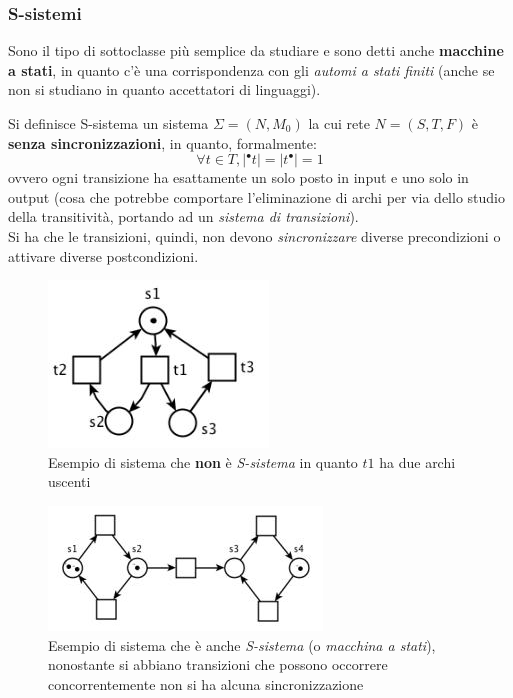 \documentclass[a4paper,12pt, oneside]{book}
\begin{document}
\subsubsection{S-sistemi}
Sono il tipo di sottoclasse più semplice da studiare e sono detti anche
\textbf{macchine a stati}, in quanto c'è una corrispondenza con gli
\textit{automi a stati finiti} (anche se non si studiano in quanto accettatori
di linguaggi).
\begin{definizione}
  Si definisce S-sistema un sistema $\Sigma = (N,M_0)$ la cui rete $N=(S,T,F)$ è
  \textbf{senza sincronizzazioni}, in quanto, formalmente:
  \[\forall t\in T, |^\bullet t|=|t^\bullet|=1\]
  ovvero ogni transizione ha esattamente un solo posto in input e uno solo in
  output (cosa che potrebbe comportare l'eliminazione di archi per via dello
  studio della transitività, portando ad un \textit{sistema di transizioni}).\\
  Si ha che le transizioni, quindi, non devono \textit{sincronizzare} diverse
  precondizioni o attivare diverse postcondizioni.
  \begin{figure}[H]
    \centering
    \includegraphics[scale = 0.7]{img/ssi.jpg}
    \caption{Esempio di sistema che \textbf{non} è \emph{S-sistema} in quanto
      $t1$ ha due archi uscenti}
  \end{figure}
   \begin{figure}[H]
    \centering
    \includegraphics[scale = 0.6]{img/ssi2.jpg}
    \caption{Esempio di sistema che è anche \emph{S-sistema} (o
      \emph{macchina a stati}), nonostante si abbiano transizioni che possono
      occorrere concorrentemente non si ha alcuna sincronizzazione} 
  \end{figure}
\end{definizione}
\end{document}
